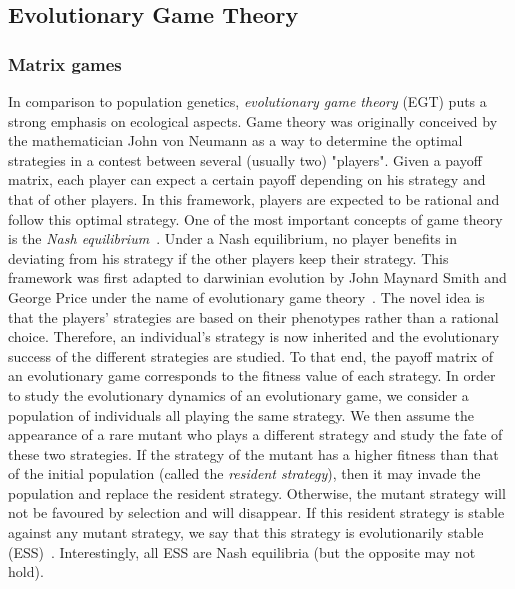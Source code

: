 

    \subsection{Evolutionary Game Theory}

        \subsubsection{Matrix games}

            In comparison to population genetics, \emph{evolutionary game theory} (EGT) puts a strong emphasis on ecological aspects. Game theory was originally conceived by the mathematician John von Neumann as a way to determine the optimal strategies in a contest between several (usually two) "players". Given a payoff matrix, each player can expect a certain payoff depending on his strategy and that of other players. In this framework, players are expected to be rational and follow this optimal strategy. One of the most important concepts of game theory is the \emph{Nash equilibrium}~\parencite{Nash1950}. Under a Nash equilibrium, no player benefits in deviating from his strategy if the other players keep their strategy. This framework was first adapted to darwinian evolution by John Maynard Smith and George Price under the name of evolutionary game theory~\parencite{MaynardSmith1973}. The novel idea is that the players' strategies are based on their phenotypes rather than a rational choice. Therefore, an individual's strategy is now inherited and the evolutionary success of the different strategies are studied. To that end, the payoff matrix of an evolutionary game corresponds to the fitness value of each strategy. In order to study the evolutionary dynamics of an evolutionary game, we consider a population of individuals all playing the same strategy. We then assume the appearance of a rare mutant who plays a different strategy and study the fate of these two strategies. If the strategy of the mutant has a higher fitness than that of the initial population (called the \emph{resident strategy}), then it may invade the population and replace the resident strategy. Otherwise, the mutant strategy will not be favoured by selection and will disappear. If this resident strategy is stable against any mutant strategy, we say that this strategy is evolutionarily stable (ESS)~\parencite{MaynardSmith1973}. Interestingly, all ESS are Nash equilibria (but the opposite may not hold).

